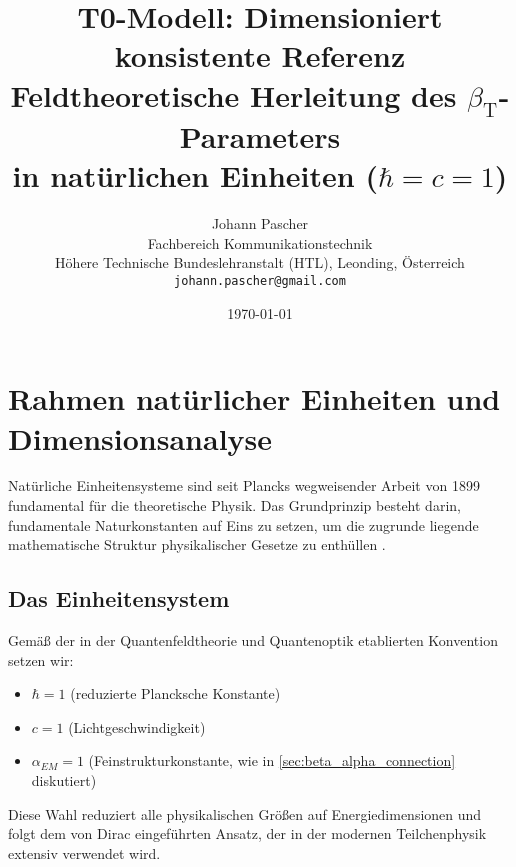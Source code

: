 \documentclass[12pt,a4paper]{article}
\newcommand{\betaT}{\beta_{\text{T}}}
\begin{document}
	
	\title{T0-Modell: Dimensioniert konsistente Referenz \\
		Feldtheoretische Herleitung des $\betaT$-Parameters \\
		in natürlichen Einheiten ($\hbar = c = 1$)}
	\author{Johann Pascher\\
		Fachbereich Kommunikationstechnik\\
		Höhere Technische Bundeslehranstalt (HTL), Leonding, Österreich\\
		\texttt{johann.pascher@gmail.com}}
	\date{\today}
	
	\maketitle
	\tableofcontents
	\newpage
	
	\section{Rahmen natürlicher Einheiten und Dimensionsanalyse}
	\label{sec:natural_units}
	
	Natürliche Einheitensysteme sind seit Plancks wegweisender Arbeit von 1899 \citep{planck1900,planck1906} fundamental für die theoretische Physik. Das Grundprinzip besteht darin, fundamentale Naturkonstanten auf Eins zu setzen, um die zugrunde liegende mathematische Struktur physikalischer Gesetze zu enthüllen \citep{weinberg1995,peskin1995}.
	
	\subsection{Das Einheitensystem}
	\label{subsec:unit_system}
	
	Gemäß der in der Quantenfeldtheorie \citep{peskin1995,weinberg1995} und Quantenoptik \citep{scully1997} etablierten Konvention setzen wir:
	\begin{itemize}
		\item $\hbar = 1$ (reduzierte Plancksche Konstante)
		\item $c = 1$ (Lichtgeschwindigkeit)
		\item $\alpha_{EM} = 1$ (Feinstrukturkonstante, wie in \cref{sec:beta_alpha_connection} diskutiert)
	\end{itemize}
	
	Diese Wahl reduziert alle physikalischen Größen auf Energiedimensionen und folgt dem von Dirac \citep{dirac1958} eingeführten Ansatz, der in der modernen Teilchenphysik \citep{griffiths2008} extensiv verwendet wird.
	
\end{document}
